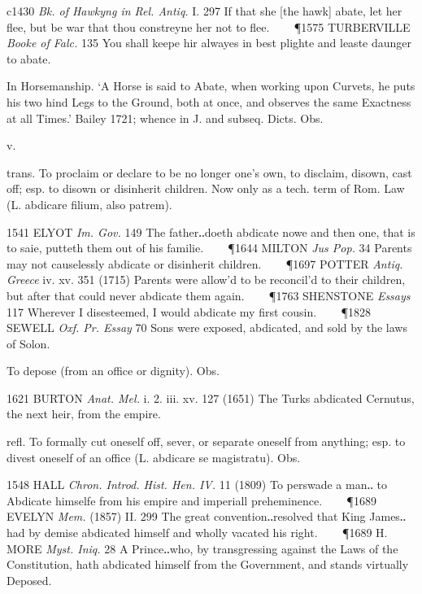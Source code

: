 \begin{description}[wide, labelwidth=!, labelindent=0pt]
\begin{myenumerate}
c1430 \textit{Bk. of Hawkyng in Rel. Antiq.} I. 297 If that she [the hawk] 
abate, let her flee, but be war that thou constreyne her not to flee.    
\P 1575 TURBERVILLE \textit{Booke of Falc.} 135 You shall keepe hir alwayes 
in best plighte and leaste daunger to abate.

 In Horsemanship. ‘A Horse is said to Abate, when working upon 
Curvets, he puts his two hind Legs to the Ground, both at once, and observes 
the same Exactness at all Times.’ Bailey 1721; whence in J. and subseq. 
Dicts. Obs.
\end{myenumerate}


 v. 

\noindent {}

\vspace{-0.3cm}

\begin{myenumerate}
 trans. To proclaim or declare to be no longer one's own, 
to disclaim, disown, cast off; esp. to disown or disinherit children. Now 
only as a tech. term of Rom. Law (L. abdicare filium, also patrem). 

1541 ELYOT \textit{Im. Gov.} 149 The father‥doeth abdicate nowe and then 
one, that is to saie, putteth them out of his familie.    
\P 1644 MILTON \textit{Jus Pop.} 34 Parents may not causelessly abdicate 
or disinherit children.    
\P 1697 POTTER \textit{Antiq. Greece} iv. xv. 351 (1715) Parents were 
allow'd to be reconcil'd to their children, but after that could never 
abdicate them again.    
\P 1763 SHENSTONE \textit{Essays} 117 Wherever I disesteemed, I would 
abdicate my first cousin.    
\P 1828 SEWELL \textit{Oxf. Pr. Essay} 70 Sons were exposed, abdicated, 
and sold by the laws of Solon.

 To depose (from an office or dignity). Obs. 

1621 BURTON \textit{Anat. Mel.} i. 2. iii. xv. 127 (1651) The Turks 
abdicated Cernutus, the next heir, from the empire.

 refl. To formally cut oneself off, sever, or separate oneself 
from anything; esp. to divest oneself of an office (L. abdicare se magistratu). 
Obs. 

1548 HALL \textit{Chron. Introd. Hist. Hen. IV.} 11 (1809) To perswade a man‥
to Abdicate himselfe from his empire and imperiall preheminence.    
\P 1689 EVELYN \textit{Mem.} (1857) II. 299 The great convention‥resolved that 
King James‥had by demise abdicated himself and wholly vacated his right.    
\P 1689 H. MORE \textit{Myst. Iniq.} 28 A Prince‥who, by transgressing 
against the Laws of the Constitution, hath abdicated himself from the 
Government, and stands virtually Deposed.


\end{myenumerate}
\end{description}
